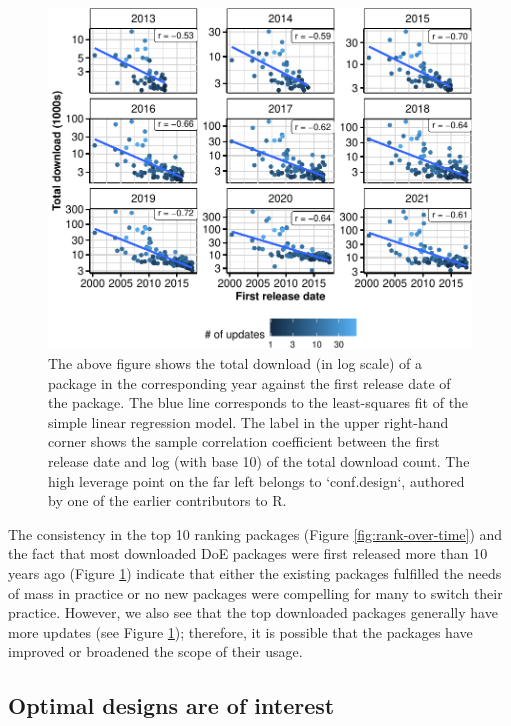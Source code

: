 \begin{figure}[htbp]

{\centering \includegraphics{figures/release-date-vs-download-1} 

}

\caption{The above figure shows the total download (in log scale) of a package in the corresponding year against the first release date of the package. The blue line corresponds to the least-squares fit of the simple linear regression model. The label in the upper right-hand corner shows the sample correlation coefficient between the first release date and log (with base 10) of the total download count. The high leverage point on the far left belongs to `conf.design`, authored by one of the earlier contributors to R.}\label{fig:release-date-vs-download}
\end{figure}

The consistency in the top 10 ranking packages (Figure \ref{fig:rank-over-time}) and the fact that most downloaded DoE packages were first released more than 10 years ago (Figure \ref{fig:release-date-vs-download}) indicate that either the existing packages fulfilled the needs of mass in practice or no new packages were compelling for many to switch their practice. However, we also see that the top downloaded packages generally have more updates (see Figure \ref{fig:release-date-vs-download}); therefore, it is possible that the packages have improved or broadened the scope of their usage.

\hypertarget{optimal-designs-are-of-interest}{%
\subsection{Optimal designs are of interest}\label{optimal-designs-are-of-interest}}


